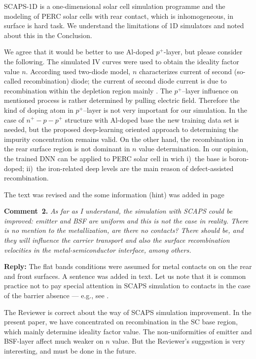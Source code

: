 \documentclass[num-refs]{wiley-article} %
\begin{document}
SCAPS-1D is a one-dimensional solar cell simulation programme and
the modeling of PERC solar cells with rear contact, which is
inhomogeneous, in surface is hard task.
We understand the limitations of 1D simulators and noted about this in the Conclusion.

We agree that it would be better to use Al-doped $p^+$-layer, but please consider the following.
The simulated IV curves were used to obtain the ideality factor value $n$.
According used two-diode model,
$n$ characterizes current of second (so-called recombination)  diode;
the current of second diode current is due to recombination within
the depletion region mainly \citep{Breitenstein2013}.
The $p^+$--layer influence on mentioned process is rather determined by
pulling electric field.
Therefore the kind of doping atom in $p^+$--layer is not very important for our simulation.
In the case of $n^+-p-p^+$ structure with Al-doped base the new training data set is needed,
but the proposed deep-learning oriented approach to determining the impurity concentration remains valid.
On the other hand, the recombination in the rear surface region is not dominant
in $n$ value determination.
In our opinion, the trained DNN can be applied to PERC solar cell in wich
i)~the base is boron-doped;
ii)~the iron-related deep levels are the main reason of defect-assisted recombination.


The text was revised and the some information (hint) was added in page


\vspace{1cm}
\noindent
\textcolor[rgb]{0.00,0.50,1.00}{\textbf{Comment~2.}}
\emph{As far as I understand, the simulation with SCAPS could be improved: emitter and BSF are uniform and this is not the case in reality.
There is no mention to the metallization, are there no contacts?
There should be, and they will influence the carrier transport and also the surface recombination velocities in the metal-semiconductor interface, among others.}

\vspace{0.5cm}
\noindent
\textcolor[rgb]{0.51,0.00,0.00}{\textbf{Reply:}}
The flat bands conditions were assumed for metal contacts on on the rear and
front surfaces.
A sentence was added in text. 
Let us note that it is common practice not to pay special attention in SCAPS simulation 
to contacts in the case of
the barrier absence --- e.g., see \cite{SCAPSuseSi4,SCAPSuseSi1,SCAPSuse1,SCAPSuse5,ScapsUse10}.



The Reviewer is correct about the way of SCAPS simulation improvement.
In the present paper, we have concentrated on recombination in the SC base region,
which mainly determine ideality factor value.
The non-uniformities of emitter and  BSF-layer affect much weaker on $n$ value.
But the Reviewer’s suggestion is very interesting, and must be done in the 
future. 
\end{document}
